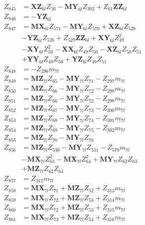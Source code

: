 \begin{multicols}{2}
\begin{align}
Z_{845} &= \mathbf{XZ}_{6l}Z_{56} - \mathbf{MY}_{6l}Z_{302} + Z_{61}\mathbf{ZZ}_{6l} \nonumber \\
Z_{846} &= -\mathbf{YZ}_{6l} \nonumber \\
Z_{847} &= \mathbf{MX}_{6l}Z_{571} - \mathbf{MY}_{6l}Z_{570} + \mathbf{XZ}_{6l}Z_{528}  \nonumber \\
&- \mathbf{YZ}_{6l}Z_{526} + Z_{529}\mathbf{ZZ}_{6l} + \mathbf{XY}_{6l}Z_{49}^2  \nonumber \\
&- \mathbf{XY}_{6l}Z_{50}^2 - \mathbf{XX}_{6l}Z_{49}Z_{50} - \mathbf{XZ}_{6l}Z_{50}Z_{51}  \nonumber \\
&+ \mathbf{YY}_{6l}Z_{49}Z_{50} + \mathbf{YZ}_{6l}Z_{49}Z_{51} \nonumber \\
Z_{848} &= -Z_{296}m_{7l} \nonumber \\
Z_{849} &= \mathbf{MZ}_{7l}Z_{65} - \mathbf{MY}_{7l}Z_{71} - Z_{297}m_{7l} \nonumber \\
Z_{850} &= \mathbf{MZ}_{7l}Z_{66} - \mathbf{MY}_{7l}Z_{72} - Z_{298}m_{7l} \nonumber \\
Z_{851} &= \mathbf{MZ}_{7l}Z_{66} - \mathbf{MY}_{7l}Z_{72} - Z_{299}m_{7l} \nonumber \\
Z_{852} &= \mathbf{MZ}_{7l}Z_{67} - \mathbf{MY}_{7l}Z_{73} - Z_{300}m_{7l} \nonumber \\
Z_{853} &= \mathbf{MZ}_{7l}Z_{68} - \mathbf{MY}_{7l}Z_{74} - Z_{301}m_{7l} \nonumber \\
Z_{854} &= \mathbf{MZ}_{7l}Z_{69} - \mathbf{MY}_{7l}Z_{75} - Z_{302}m_{7l} \nonumber \\
Z_{855} &= \mathbf{MZ}_{7l}Z_{70} - \mathbf{MY}_{7l}Z_{76} \nonumber \\
Z_{856} &= \mathbf{MZ}_{7l}Z_{530} - \mathbf{MY}_{7l}Z_{531} - Z_{570}m_{7l}  \nonumber \\
&- \mathbf{MX}_{7l}Z_{63}^2 - \mathbf{MX}_{7l}Z_{64}^2 + \mathbf{MY}_{7l}Z_{62}Z_{63}  \nonumber \\
&+ \mathbf{MZ}_{7l}Z_{62}Z_{64} \nonumber \\
Z_{857} &= Z_{312}m_{7l} \nonumber \\
Z_{858} &= \mathbf{MX}_{7l}Z_{71} + \mathbf{MZ}_{7l}Z_{52} + Z_{313}m_{7l} \nonumber \\
Z_{859} &= \mathbf{MX}_{7l}Z_{72} + \mathbf{MZ}_{7l}Z_{53} + Z_{314}m_{7l} \nonumber \\
Z_{860} &= \mathbf{MX}_{7l}Z_{72} + \mathbf{MZ}_{7l}Z_{53} + Z_{315}m_{7l} \nonumber \\
Z_{861} &= \mathbf{MX}_{7l}Z_{73} + \mathbf{MZ}_{7l}Z_{54} + Z_{316}m_{7l} \nonumber \\

\end{align}
\end{multicols}
